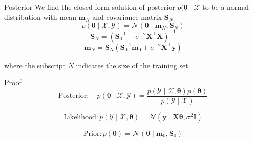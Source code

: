\documentclass{beamer}
\begin{document}

\begin{frame}{Posterior}
We find the closed form solution of posterior $p(\boldsymbol{\theta} \mid \mathcal{X}$ to be a normal distribution with mean $\boldsymbol{m}_N$ and covariance matrix $ \boldsymbol{S}_N$\\
\vspace{10pt}
\begin{equation*}
p(\boldsymbol{\theta} \mid \mathcal{X}, \mathcal{Y})  =\mathcal{N}\left(\boldsymbol{\theta} \mid \boldsymbol{m}_N, \boldsymbol{S}_N\right)
\end{equation*}
\begin{equation*}
 \boldsymbol{S}_N  =\left(\boldsymbol{S}_0^{-1}+\sigma^{-2} \boldsymbol{X}^{\top} \boldsymbol{X}\right)^{-1}
\end{equation*}
\begin{equation*}
\boldsymbol{m}_N  =\boldsymbol{S}_N\left(\boldsymbol{S}_0^{-1} \boldsymbol{m}_0+\sigma^{-2} \boldsymbol{X}^{\top} \boldsymbol{y}\right)
\end{equation*}

where the subscript $N$ indicates the size of the training set.
\end{frame}

\begin{frame} {Proof}
\begin{equation*}
\textrm{Posterior}:  \quad p(\boldsymbol{\theta} \mid \mathcal{X}, \mathcal{Y})=\frac{p(\mathcal{Y} \mid \mathcal{X}, \boldsymbol{\theta}) p(\boldsymbol{\theta})}{p(\mathcal{Y} \mid \mathcal{X})}
\end{equation*}

\begin{equation*}
\textrm{Likelihood}: p(\mathcal{Y} \mid \mathcal{X}, \boldsymbol{\theta})=\mathcal{N}\left(\boldsymbol{y} \mid \boldsymbol{X} \boldsymbol{\theta}, \sigma^2 \boldsymbol{I}\right)
\end{equation*}

\begin{equation*}
\textrm{Prior}: p(\boldsymbol{\theta})=\mathcal{N}\left(\boldsymbol{\theta} \mid \boldsymbol{m}_0, \boldsymbol{S}_0\right)
\end{equation*}

\end{frame}
\end{document}
